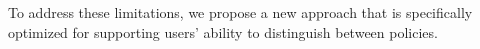 To address these limitations, we propose a new approach that is specifically
optimized for supporting users' ability to distinguish between policies.  



